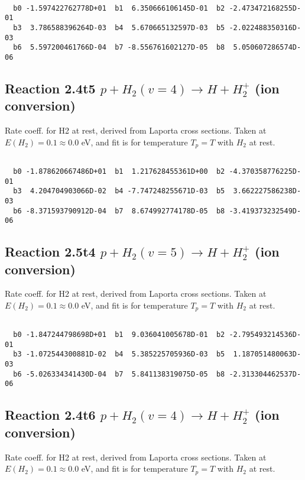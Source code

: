 \begin{small}\begin{verbatim}

  b0 -1.597422762778D+01  b1  6.350666106145D-01  b2 -2.473472168255D-01
  b3  3.786588396264D-03  b4  5.670665132597D-03  b5 -2.022488350316D-03
  b6  5.597200461766D-04  b7 -8.556761602127D-05  b8  5.050607286574D-06

\end{verbatim}\end{small}

\newpage
\subsection{
Reaction 2.4t5
$ p + H_2(v=4) \rightarrow H + H_2^+$ (ion conversion)
}
Rate coeff. for H2 at rest, derived from Laporta cross sections.
Taken at $E(H_2) = 0.1 \approx 0.0$ eV,  and fit is for temperature $T_p=T$ with $H_2$ at rest.

\begin{small}\begin{verbatim}

  b0 -1.878620667486D+01  b1  1.217628455361D+00  b2 -4.370358776225D-01
  b3  4.204704903066D-02  b4 -7.747248255671D-03  b5  3.662227586238D-03
  b6 -8.371593790912D-04  b7  8.674992774178D-05  b8 -3.419373232549D-06

\end{verbatim}\end{small}

\newpage
\subsection{
Reaction 2.5t4
$ p + H_2(v=5) \rightarrow H + H_2^+$ (ion conversion)
}
Rate coeff. for H2 at rest, derived from Laporta cross sections.
Taken at $E(H_2) = 0.1 \approx 0.0$ eV,  and fit is for temperature $T_p=T$ with $H_2$ at rest.

\begin{small}\begin{verbatim}

  b0 -1.847244798698D+01  b1  9.036041005678D-01  b2 -2.795493214536D-01
  b3 -1.072544300881D-02  b4  5.385225705936D-03  b5  1.187051480063D-03
  b6 -5.026334341430D-04  b7  5.841138319075D-05  b8 -2.313304462537D-06

\end{verbatim}\end{small}

\newpage
\subsection{
Reaction 2.4t6
$ p + H_2(v=4) \rightarrow H + H_2^+$ (ion conversion)
}
Rate coeff. for H2 at rest, derived from Laporta cross sections.
Taken at $E(H_2) = 0.1 \approx 0.0$ eV,  and fit is for temperature $T_p=T$ with $H_2$ at rest.


